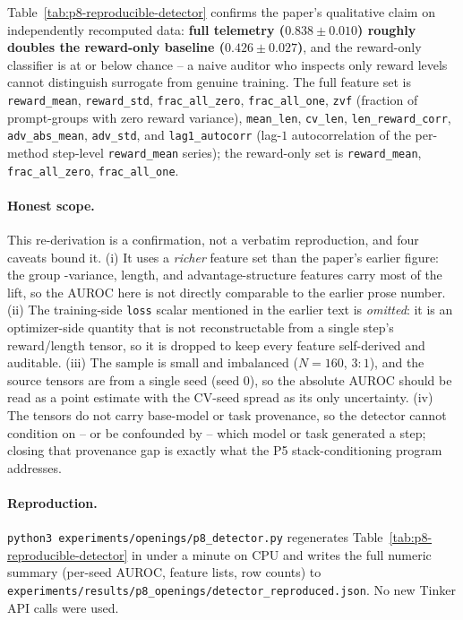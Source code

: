 \documentclass{article}
\providecommand{\tableref}[1]{Table~\ref{#1}}
\begin{document}
\tableref{tab:p8-reproducible-detector} confirms the paper's qualitative
claim on independently recomputed data: \textbf{full telemetry
($0.838 \pm 0.010$) roughly doubles the reward-only baseline
($0.426 \pm 0.027$)}, and the reward-only classifier is at or below
chance -- a naive auditor who inspects only reward levels cannot
distinguish surrogate from genuine training. The full feature set is
\texttt{reward\_mean}, \texttt{reward\_std}, \texttt{frac\_all\_zero},
\texttt{frac\_all\_one}, \texttt{zvf} (fraction of prompt-groups with
zero reward variance), \texttt{mean\_len}, \texttt{cv\_len},
\texttt{len\_reward\_corr}, \texttt{adv\_abs\_mean}, \texttt{adv\_std},
and \texttt{lag1\_autocorr} (lag-$1$ autocorrelation of the per-method
step-level \texttt{reward\_mean} series); the reward-only set is
\texttt{reward\_mean}, \texttt{frac\_all\_zero}, \texttt{frac\_all\_one}.

\paragraph{Honest scope.} This re-derivation is a confirmation, not a
verbatim reproduction, and four caveats bound it. (i) It uses a
\emph{richer} feature set than the paper's earlier figure: the group
-variance, length, and advantage-structure features carry most of the
lift, so the AUROC here is not directly comparable to the earlier
prose number. (ii) The training-side \texttt{loss} scalar mentioned in
the earlier text is \emph{omitted}: it is an optimizer-side quantity
that is not reconstructable from a single step's reward/length tensor,
so it is dropped to keep every feature self-derived and auditable.
(iii) The sample is small and imbalanced ($N{=}160$, $3{:}1$), and the
source tensors are from a single seed (seed $0$), so the absolute AUROC
should be read as a point estimate with the CV-seed spread as its only
uncertainty. (iv) The tensors do not carry base-model or task
provenance, so the detector cannot condition on -- or be confounded by
-- which model or task generated a step; closing that provenance gap is
exactly what the P5 stack-conditioning program addresses.

\paragraph{Reproduction.} \texttt{python3
experiments/openings/p8\_detector.py} regenerates
\tableref{tab:p8-reproducible-detector} in under a minute on CPU and
writes the full numeric summary (per-seed AUROC, feature lists, row
counts) to
\texttt{experiments/results/p8\_openings/detector\_reproduced.json}. No
new Tinker API calls were used.
\end{document}
